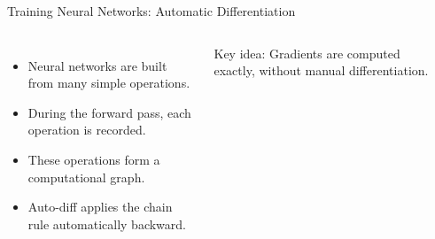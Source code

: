 \documentclass[aspectratio=169]{beamer}
\newcommand{\1}{\mathbf{1}}
\begin{document}
\begin{frame}{Training Neural Networks: Automatic Differentiation}
\small

\begin{columns}
\begin{itemize}
    \item Neural networks are built from many simple operations.
    \item During the forward pass, each operation is recorded.
    \item These operations form a computational graph.
    \item Auto-diff applies the chain rule automatically backward.
\end{itemize}

\vspace{0.6em}
Key idea:  
Gradients are computed exactly, without manual differentiation.


\begin{center}
\end{center}

\end{columns}
\end{frame}
\end{document}
